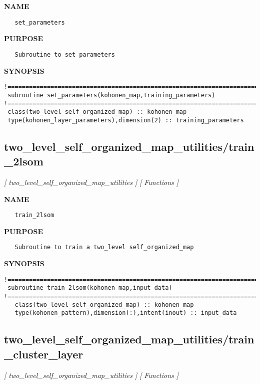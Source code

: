 \documentclass{article}
\begin{document}
\label{ch:robo77}
\label{ch:two_level_self_organized_map_utilities_set_parameters}
\textbf{NAME}
\begin{verbatim}
   set_parameters
\end{verbatim}
\textbf{PURPOSE}
\begin{verbatim}
   Subroutine to set parameters
\end{verbatim}
\textbf{SYNOPSIS}
\begin{verbatim}
!========================================================================================  
 subroutine set_parameters(kohonen_map,training_parameters)
!========================================================================================  
 class(two_level_self_organized_map) :: kohonen_map
 type(kohonen_layer_parameters),dimension(2) :: training_parameters
\end{verbatim}
\newpage
\subsection{two\_level\_self\_organized\_map\_utilities/train\_2lsom}
\textsl{[ two\_level\_self\_organized\_map\_utilities ]}
\textsl{[ Functions ]}

\label{ch:robo78}
\label{ch:two_level_self_organized_map_utilities_train_2lsom}
\textbf{NAME}
\begin{verbatim}
   train_2lsom
\end{verbatim}
\textbf{PURPOSE}
\begin{verbatim}
   Subroutine to train a two_level self_organized_map 
\end{verbatim}
\textbf{SYNOPSIS}
\begin{verbatim}
!========================================================================================
 subroutine train_2lsom(kohonen_map,input_data)
!========================================================================================
   class(two_level_self_organized_map) :: kohonen_map
   type(kohonen_pattern),dimension(:),intent(inout) :: input_data
\end{verbatim}
\newpage
\subsection{two\_level\_self\_organized\_map\_utilities/train\_cluster\_layer}
\textsl{[ two\_level\_self\_organized\_map\_utilities ]}
\textsl{[ Functions ]}
\end{document}
